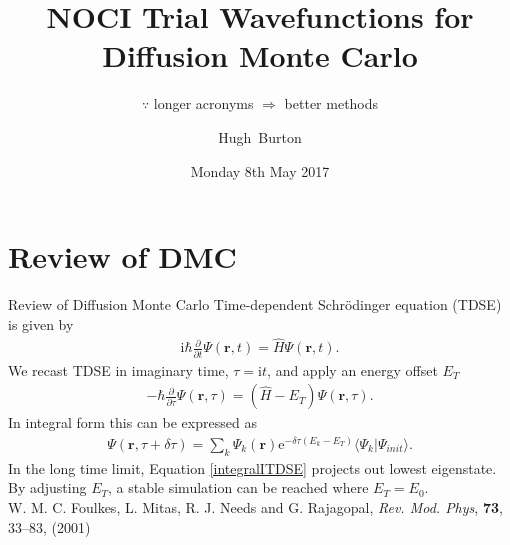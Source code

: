 \documentclass{beamer}
\title[MainTitle]
{%
  NOCI Trial Wavefunctions for Diffusion Monte Carlo
}
\subtitle{$\because$ longer acronyms $\Rightarrow$ better methods}
\author
{
  \hskip-1.7mm
  Hugh~Burton %
}
\institute[Burton and others]
{
  University of Cambridge
}
\date{Monday 8th May 2017}
\newcommand{\II}{\mathrm{i}}
\begin{document}
\begin{frame}
  \titlepage
\end{frame}


\section{Review of DMC}

\begin{frame}{Review of Diffusion Monte Carlo}
  Time-dependent Schr\"{o}dinger equation (TDSE) is given by
  \small{\begin{align}
    \label{TDSE}
    \II \hbar \frac{\partial}{\partial t} \Psi (\mathbf{r}, t) = \hat{H} \Psi (\mathbf{r}, t).
  \end{align}}%
  We recast TDSE in imaginary time, $\tau = \II t$, and apply an energy offset $E_T$
  \small{\begin{align}
  \label{ITDSE}
    - \hbar \frac{\partial}{\partial \tau} \Psi (\mathbf{r}, \tau) = (\hat{H} - E_T) \Psi (\mathbf{r}, \tau).
  \end{align}}%
  In integral form this can be expressed as
  \small{\begin{align}
    \label{integralITDSE}
    \Psi(\mathbf{r},\tau+\delta \tau) =  \sum_k \Psi_k(\mathbf{r}) \mathrm{e}^{-\delta \tau(E_k - E_T)} \langle \Psi_k | \Psi_{init} \rangle.
  \end{align}}%
 In the long time limit, Equation \ref{integralITDSE} projects out lowest eigenstate.
 By adjusting $E_T$, a stable simulation can be reached where $E_T = E_0$. \\
 \vspace{1em}
 \tiny{W. M. C. Foulkes, L. Mitas, R. J. Needs and G. Rajagopal, \textit{Rev. Mod. Phys}, \textbf{73}, 33--83, (2001)
 }%
\end{frame}
\end{document}
